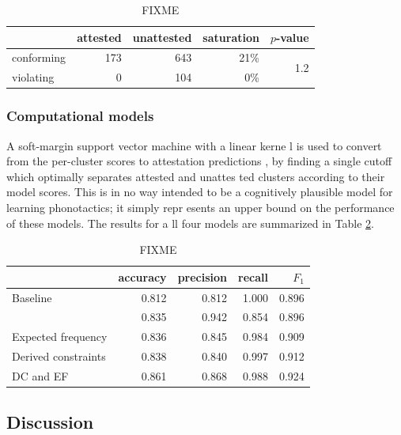 \begin{table}
\centering
\begin{tabular}{l rrrr}
\toprule
           & attested & unattested & saturation & $p$-value \\
\midrule
conforming & 173      & 643        & 21\%       & \multirow{2}{*}{1.2\e{-10}} \\
violating  & 0        & 104        & 0\%        \\
\bottomrule
\end{tabular}
\caption{FIXME}
\label{degemtab}
\end{table}

\subsubsection{Computational models}

A soft-margin support vector machine \citep{Cortes1995} with a linear kerne
l is used to convert from the per-cluster scores to attestation predictions
, by finding a single cutoff which optimally separates attested and unattes
ted clusters according to their model scores. This is in no way intended to
 be a cognitively plausible model for learning phonotactics; it simply repr
esents an upper bound on the performance of these models. The results for a
ll four models are summarized in Table \ref{cmresults}.

\begin{table} 
\centering
\begin{tabular}{l | rrrr}
\toprule
                    & accuracy & precision & recall & $F_1$ \\
\midrule
Baseline            & 0.812    & 0.812     & 1.000  & 0.896 \\
\citet{Hayes2008a}  & 0.835    & 0.942     & 0.854  & 0.896 \\
Expected frequency  & 0.836    & 0.845     & 0.984  & 0.909 \\
Derived constraints & 0.838    & 0.840     & 0.997  & 0.912 \\
DC and EF           & 0.861    & 0.868     & 0.988  & 0.924 \\
\bottomrule
\end{tabular}
\caption{FIXME}
\label{cmresults}
\end{table}

\subsection{Discussion}

